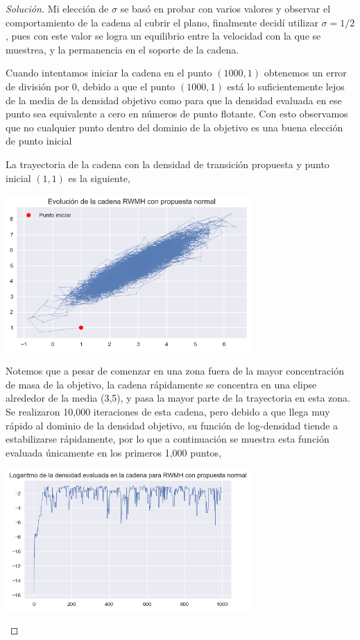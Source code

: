 \documentclass{article}
\begin{document}
\begin{enumerate}
\begin{proof}[Solución]
        Mi elección de $\sigma$ se basó en probar con varios valores y observar el comportamiento 
        de la cadena al cubrir el plano, finalmente decidí utilizar $\sigma = 1/2$, pues con este
        valor se logra un equilibrio entre la velocidad con la que se muestrea, y la permanencia 
        en el soporte de la cadena.


        Cuando intentamos iniciar la cadena en el punto $(1000,1)$ obtenemos un error de 
        división por 0, debido a que el punto $(1000,1)$ está lo suficientemente lejos de 
        la media de la densidad objetivo como para que la densidad evaluada en ese punto sea
        equivalente a cero en números de punto flotante. Con esto observamos que no cualquier
        punto dentro del dominio de la objetivo es una buena elección de punto inicial
        
        La trayectoria de la cadena con la densidad de transición propuesta y 
        punto inicial $(1,1)$ es la siguiente,

        \begin{center}
            \includegraphics[width=0.7\textwidth]{tarea7/trajrwnorm.png}
        \end{center}

        Notemos que a pesar de comenzar en una zona fuera de la mayor concentración de masa de 
        la objetivo, la cadena rápidamente se concentra en una elipse alrededor de la media (3,5), y
        pasa la mayor parte de la trayectoria en esta zona. Se realizaron 10,000 iteraciones de esta
        cadena, pero debido a que llega muy rápido al dominio de la densidad objetivo, su función
        de log-densidad tiende a estabilizarse rápidamente, por lo que a continuación se muestra esta 
        función evaluada únicamente en los primeros 1,000 puntos,

        \begin{center}
            \includegraphics[width=0.7\textwidth]{tarea7/logdensrwnorm.png}
        \end{center}


\end{proof}
\end{enumerate}
\end{document}
